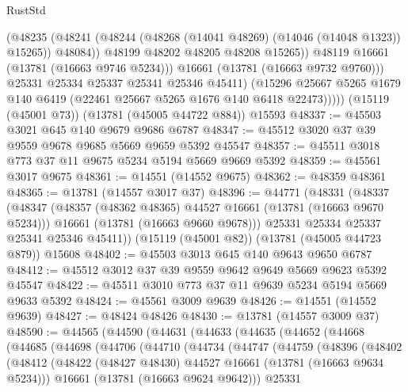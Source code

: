 \begin{lexlean}{RustStd}
\begin{coremodule}
                    (@48235
                      (@48241
                        (@48244 (@48268 (@14041 @48269) (@14046 (@14048 @1323)) @15265))
                        @48084))
                    @48199
                    @48202
                    @48205
                    @48208
                    @15265))
                @48119
                @16661
                (@13781 (@16663 @9746 @5234)))
              @16661
              (@13781 (@16663 @9732 @9760)))
            @25331
            @25334
            @25337
            @25341
            @25346
            @45411)
          (@15296 @25667 @5265 @1679 @140 @6419 (@22461 @25667 @5265 @1676 @140 @6418 @22473)))))
    (@15119 (@45001 @73))
    (@13781 (@45005 @44722 @884))
    @15593
@48337 := @45503 @3021 @645 @140 @9679 @9686 @6787
@48347 := @45512 @3020 @37 @39 @9559 @9678 @9685 @5669 @9659 @5392 @45547
@48357 := @45511 @3018 @773 @37 @11 @9675 @5234 @5194 @5669 @9669 @5392
@48359 := @45561 @3017 @9675
@48361 := @14551 (@14552 @9675)
@48362 := @48359 @48361
@48365 := @13781 (@14557 @3017 @37)
@48396 := @44771
    (@48331
      (@48337
        (@48347
          (@48357 (@48362 @48365) @44527 @16661 (@13781 (@16663 @9670 @5234)))
          @16661
          (@13781 (@16663 @9660 @9678)))
        @25331
        @25334
        @25337
        @25341
        @25346
        @45411))
    (@15119 (@45001 @82))
    (@13781 (@45005 @44723 @879))
    @15608
@48402 := @45503 @3013 @645 @140 @9643 @9650 @6787
@48412 := @45512 @3012 @37 @39 @9559 @9642 @9649 @5669 @9623 @5392 @45547
@48422 := @45511 @3010 @773 @37 @11 @9639 @5234 @5194 @5669 @9633 @5392
@48424 := @45561 @3009 @9639
@48426 := @14551 (@14552 @9639)
@48427 := @48424 @48426
@48430 := @13781 (@14557 @3009 @37)
@48590 := @44565
    (@44590
      (@44631
        (@44633
          (@44635
            (@44652
              (@44668
                (@44685
                  (@44698
                    (@44706
                      (@44710
                        (@44734
                          (@44747
                            (@44759
                              (@48396
                                (@48402
                                  (@48412
                                    (@48422
                                      (@48427 @48430)
                                      @44527
                                      @16661
                                      (@13781 (@16663 @9634 @5234)))
                                    @16661
                                    (@13781 (@16663 @9624 @9642)))
                                  @25331

\end{coremodule}
\end{lexlean}
